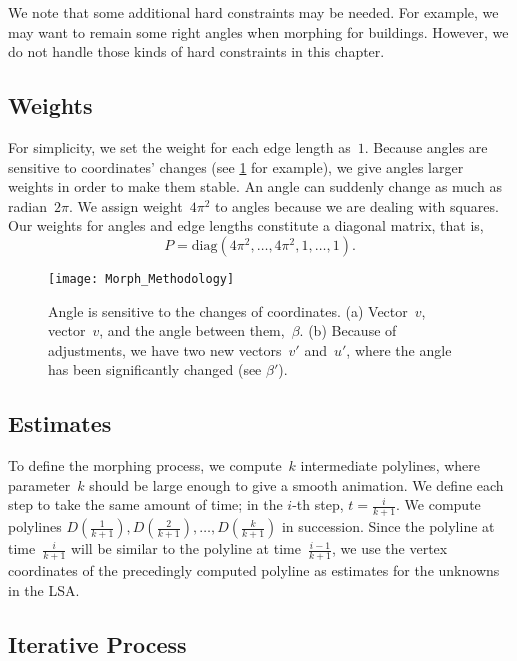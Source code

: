 We note that some additional hard constraints may be needed. 
For example, we may want to remain some right angles 
when morphing for buildings.
However, we do not handle those kinds of 
hard constraints in this chapter.

\subsection{Weights}
\label{sec:Morph_Weights}

For simplicity, we set the weight for each edge length as~$1$.
Because angles are sensitive to coordinates' changes
(see \fig\ref{fig:Morph_Weights} for example),
we give angles larger weights
in order to make them stable.
An angle can suddenly change as much as radian~$2\pi$.
We assign weight~$4\pi^2$ to angles 
because we are dealing with squares.
Our weights for angles and edge lengths constitute 
a diagonal matrix, that is,
$$
P=\mathrm{diag} (4\pi^2, \ldots,4\pi^2, 1,\ldots,1).
$$


\begin{figure}[tb]
	\centering	
	\texttt{[image: Morph\_Methodology]}
	\caption{Angle is sensitive 
		to the changes of coordinates. 
		(a) Vector~$v$, vector~$v$, 
		and the angle between them,~$\beta$.
		(b) Because of adjustments, 
		we have two new vectors~$v'$ and~$u'$,
		where the angle has been significantly changed
		(see $\beta'$).
	}
	\label{fig:Morph_Weights}
\end{figure}

\subsection{Estimates}
\label{sec:Morph_Estimates}

To define the morphing process, 
we compute~$k$ intermediate polylines,
where parameter~$k$ should be large enough 
to give a smooth animation.
We define each step to take the same amount of time; 
in the $i$-th step, $t=\frac{i}{k + 1}$. 
We compute polylines
$D(\frac{1}{k + 1}), D(\frac{2}{k + 1}),
\ldots, D(\frac{k}{k + 1})$ in succession. 
Since the polyline at time~$\frac{i}{k + 1}$ 
will be similar to the polyline at time~$\frac{i-1}{k + 1}$, 
we use the vertex coordinates of 
the precedingly computed polyline as 
estimates for the unknowns in the LSA.



\subsection{Iterative Process}\label{sec:Morph_Iterative}

